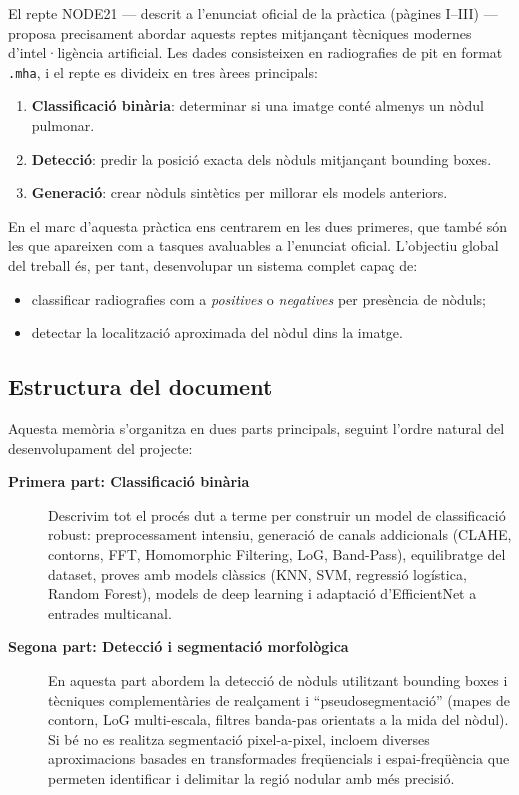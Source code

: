\documentclass[12pt,a4paper]{article}
\begin{document}
El repte NODE21 \cite{nia2025} --- descrit a l’enunciat oficial de la pràctica (pàgines I–III) \cite{uiaa2025} --- proposa precisament abordar aquests reptes mitjançant tècniques modernes d’intel·ligència artificial. Les dades consisteixen en radiografies de pit en format \texttt{.mha}, i el repte es divideix en tres àrees principals:
\begin{enumerate}
    \item \textbf{Classificació binària}: determinar si una imatge conté almenys un nòdul pulmonar.
    \item \textbf{Detecció}: predir la posició exacta dels nòduls mitjançant bounding boxes.
    \item \textbf{Generació}: crear nòduls sintètics per millorar els models anteriors.
\end{enumerate}

En el marc d’aquesta pràctica ens centrarem en les dues primeres, que també són les que apareixen com a tasques avaluables a l’enunciat oficial. L’objectiu global del treball és, per tant, desenvolupar un sistema complet capaç de:
\begin{itemize}
    \item classificar radiografies com a \textit{positives} o \textit{negatives} per presència de nòduls;
    \item detectar la localització aproximada del nòdul dins la imatge.
\end{itemize}

\subsection{Estructura del document}

Aquesta memòria s’organitza en dues parts principals, seguint l’ordre natural del desenvolupament del projecte:

\begin{description}
    \item[\textbf{Primera part: Classificació binària}]  
    Descrivim tot el procés dut a terme per construir un model de classificació robust: preprocessament intensiu, generació de canals addicionals (CLAHE, contorns, FFT, Homomorphic Filtering, LoG, Band-Pass), equilibratge del dataset, proves amb models clàssics (KNN, SVM, regressió logística, Random Forest), models de deep learning i adaptació d’EfficientNet a entrades multicanal.

    \item[\textbf{Segona part: Detecció i segmentació morfològica}]  
    En aquesta part abordem la detecció de nòduls utilitzant bounding boxes i tècniques complementàries de realçament i “pseudosegmentació” (mapes de contorn, LoG multi-escala, filtres banda-pas orientats a la mida del nòdul). Si bé no es realitza segmentació pixel-a-pixel, incloem diverses aproximacions basades en transformades freqüencials i espai-freqüència que permeten identificar i delimitar la regió nodular amb més precisió.
\end{description}
\end{document}
